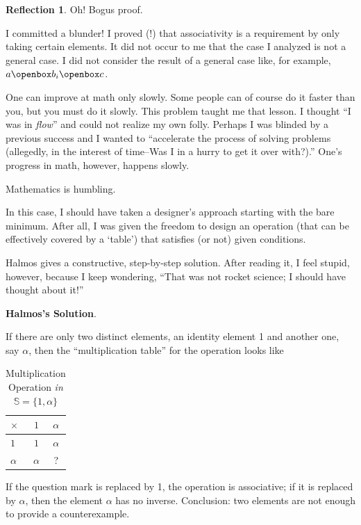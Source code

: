 \documentclass[english,notitlepage,smartquotes]{hgbreport}
\theoremstyle{definition}
\theoremstyle{definition}
\theoremstyle{remark}
\theoremstyle{definition}
\theoremstyle{plain}
\theoremstyle{definition}
\newtheorem{reflection}{Reflection}
\begin{document}
\begin{reflection}
Oh! Bogus proof.

I committed a blunder! I proved (!) that associativity is a requirement by only taking certain elements. It did not occur to me that the case I analyzed is not a general case. I did not consider the result of a general case like, for example, $a\openbox b_i\openbox c$. 

One can improve at math only slowly. Some people can of course do it faster than you, but you must do it slowly. This problem taught me that lesson. I thought ``I was in \emph{flow}'' and could not realize my own folly. Perhaps I was blinded by a previous success and I wanted to ``accelerate the process of solving problems (allegedly, in the interest of time--Was I in a hurry to get it over with?).'' One's progress in math, however, happens slowly.

Mathematics is humbling.

In this case, I should have taken a designer's approach starting with the bare minimum. After all, I was given the freedom to design an operation (that can be effectively covered by a `table') that satisfies (or not) given conditions.

Halmos gives a constructive, step-by-step solution. After reading it, I feel stupid, however, because I keep wondering, ``That was not rocket science; I should have thought about it!''
\end{reflection}

\textbf{Halmos's Solution}. 

If there are only two distinct elements, an identity element 1 and another one, say $\alpha$, then the ``multiplication table'' for the operation looks like

\begin{table}[h!]
\centering
\begin{tabular}{l|cc}
$\times$&$1$&$\alpha$\\
\hline
$1$&$1$&$\alpha$\\
$\alpha$&$\alpha$&?\\
\end{tabular}
\caption{Multiplication Operation \textit{in} $\mathbb{S}=\{1,\alpha\}$}
\label{tab:set2elem}
\end{table}

If the question mark is replaced by 1, the operation is associative; if it is replaced by $\alpha$, then the element $\alpha$ has no inverse. Conclusion: two elements are not enough to provide a counterexample.
\end{document}
